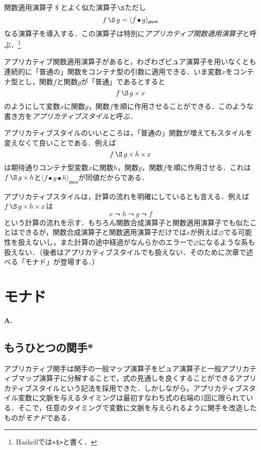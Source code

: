 \documentclass[twocolumn]{jsbook}
\newcommand{\keyword}[1]{{\emph{#1}}}
\newcommand{\code}[1]{\texttt{#1}}
\newenvironment{leader}{\begingroup\bf}{\endgroup}
\DeclareMathOperator{\hsklApplicativeApply}{\S}
\DeclareMathOperator{\hsklApplicativeMap}{\times}
\newcommand{\hsklNothing}{\varnothing}
\newcommand{\hsklPure}[1]{\langle#1\rangle_\textsf{pure}}
\DeclareMathOperator{\mathApply}{\$}
\DeclareMathOperator{\mathCompose}{\bullet}
\begin{document}
関数適用演算子$\mathApply$とよく似た演算子$\hsklApplicativeApply$ただし$$f\hsklApplicativeApply g=\hsklPure{f\mathCompose g}$$なる演算子を導入する．この演算子は特別に\keyword{アプリカティブ関数適用演算子}と呼ぶ．\footnote{Haskellでは\code{<\$>}と書く．}

アプリカティブ関数適用演算子があると，わざわざピュア演算子を用いなくとも連続的に「普通の」関数をコンテナ型の引数に適用できる．いま変数$x$をコンテナ型とし，関数$f$と関数$g$が「普通」であるとすると$$f\hsklApplicativeApply g\hsklApplicativeMap x$$のようにして変数$x$に関数$g$，関数$f$を順に作用させることができる．このような書き方を\keyword{アプリカティブスタイル}と呼ぶ．

アプリカティブスタイルのいいところは，「普通の」関数が増えてもスタイルを変えなくて良いことである．例えば$$f\hsklApplicativeApply g\hsklApplicativeMap h\hsklApplicativeMap x$$は期待通りコンテナ型変数$x$に関数$h$，関数$g$，関数$f$を順に作用させる．これは$f\hsklApplicativeApply g\hsklApplicativeMap h$と$\hsklPure{f\mathCompose g\mathCompose h}$が同値だからである．

アプリカティブスタイルは，計算の流れを明確にしているとも言える．例えば$f\hsklApplicativeApply g\hsklApplicativeMap h\hsklApplicativeMap x$は$$x\leadsto h\leadsto g\leadsto f$$という計算の流れを示す．もちろん関数合成演算子と関数適用演算子でも似たことはできるが，関数合成演算子と関数適用演算子だけでは$x$が例えば$\hsklNothing$でる可能性を扱えないし，また計算の途中経過がなんらかのエラーで$\hsklNothing$になるような系も扱えない．（後者はアプリカティブスタイルでも扱えない．そのために次章で述べる「モナド」が登場する．）

\chapter{モナド}

\begin{leader}
A.
\end{leader}


\section{もうひとつの関手*}


アプリカティブ関手は関手の一般マップ演算子をピュア演算子と一般アプリカティブマップ演算子に分解することで，式の見通しを良くすることができるアプリカティブスタイルという記法を採用できた．しかしながら，アプリカティブスタイル変数に文脈を与えるタイミングは最初すなわち式の右端の1回に限られている．そこで，任意のタイミングで変数に文脈を与えられるように関手を改造したものが\keyword{モナド}である．
\end{document}
